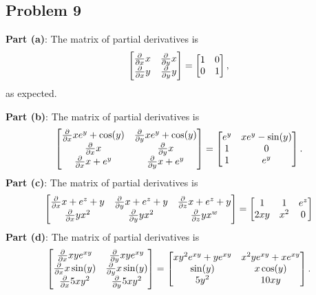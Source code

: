 \documentclass[11pt]{article}
\begin{document}

\subsection{Problem 9}

\textbf{Part (a)}: The matrix of partial derivatives is 
\[
	\begin{bmatrix} \pdv{x} x & \pdv{y} x \\ \pdv{x} y & \pdv{y} y \end{bmatrix} = \begin{bmatrix} 1 & 0 \\ 0 & 1 \end{bmatrix},
\]
as expected.

\textbf{Part (b)}: The matrix of partial derivatives is
\[
	\begin{bmatrix} \pdv{x} x e^{y} + \cos(y) & \pdv{y} x e^{y} + \cos(y) \\ \pdv{x} x & \pdv{y} x \\ \pdv{x} x + e^{y} & \pdv{y} x + e^{y} \end{bmatrix} = \begin{bmatrix}  e^{y} & x e^{y} - \sin(y) \\ 1 & 0 \\ 1 & e^{y} \end{bmatrix}.
\]
\textbf{Part (c)}: The matrix of partial derivatives is
\[
	\begin{bmatrix} \pdv{x} x + e^{z} + y & \pdv{y} x + e^{z} + y & \pdv{z} x + e^{z} + y \\ \pdv{x} yx^{2} & \pdv{y} yx^{2} & \pdv{z} yx^{w} \end{bmatrix} = \begin{bmatrix} 1 & 1 & e^{z} \\ 2xy & x^{2} & 0 \end{bmatrix}
\]
\textbf{Part (d)}: The matrix of partial derivatives is
\[
	\begin{bmatrix} \pdv{x} xy e^{xy} & \pdv{y} xy e^{xy} \\ \pdv{x} x \sin(y) & \pdv{y} x \sin(y) \\ \pdv{x} 5xy^{2} & \pdv{y} 5xy^{2} \end{bmatrix} = \begin{bmatrix} xy^{2} e^{xy} + y e^{xy} & x^{2}y e^{xy} + x e^{xy} \\ \sin(y) & x \cos(y) \\ 5y^{2} & 10xy \end{bmatrix}.
\]
\end{document}
